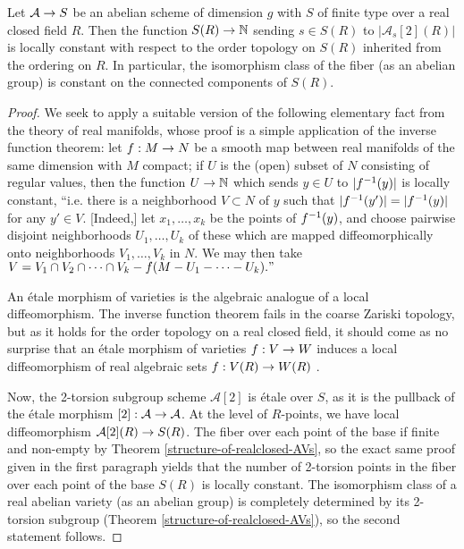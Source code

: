 \begin{proposition}
\label{deformation}
Let $\mathcal{A}\rightarrow S$ be an abelian scheme of dimension $g$ with $S$ of finite type over a real closed field $R$. Then the function $S(R)\rightarrow \mathbb{N}$ sending $s\in S(R)$ to $|\mathcal{A}_s[2](R)|$ is locally constant with respect to the order topology on $S(R)$ inherited from the ordering on $R$. In particular, the isomorphism class of the fiber (as an abelian group) is constant on the connected components of $S(R)$.
\end{proposition}
\begin{proof}
We seek to apply a suitable version of the following elementary fact from the theory of real manifolds, whose proof is a simple application of the inverse function theorem: let $f:M\rightarrow N$ be a smooth map between real manifolds of the same dimension with $M$ compact; if $U$ is the (open) subset of $N$ consisting of regular values, then the function $U\rightarrow \mathbb{N}$ which sends $y\in U$ to $|f^{-1}(y)|$ is locally constant, ``i.e. there is a neighborhood $V\subset N$ of $y$ such that $|f^{-1}(y')|=|f^{-1}(y)|$ for any $y'\in V$. [Indeed,] let $x_1,\dots, x_k$ be the points of $f^{-1}(y)$, and choose pairwise disjoint neighborhoods $U_1,\dots, U_k$ of these which are mapped diffeomorphically onto neighborhoods $V_1,\dots, V_k$ in $N$. We may then take $V=V_1\cap V_2\cap \cdots \cap V_k- f(M- U_1-\cdots- U_k)."$ \cite[pg. 8]{milnor}

An \'etale morphism of varieties is the algebraic analogue of a local diffeomorphism. The inverse function theorem fails in the coarse Zariski topology, but as it holds for the order topology on a real closed field, it should come as no surprise that an \'etale morphism of varieties $f:V\rightarrow W$ induces a local diffeomorphism of real algebraic sets $f:V(R)\rightarrow W(R)$ \cite[Proposition 8.1.2]{real}.

Now, the 2-torsion subgroup scheme $\mathcal{A}[2]$ is \'etale over $S$, as it is the pullback of the \'etale morphism $[2]:\mathcal{A}\rightarrow \mathcal{A}$. At the level of $R$-points, we have local diffeomorphism $\mathcal{A}[2](R)\rightarrow S(R)$. The fiber over each point of the base if finite and non-empty by Theorem \ref{structure-of-realclosed-AVs}, so the exact same proof given in the first paragraph yields that the number of 2-torsion points in the fiber over each point of the base $S(R)$ is locally constant. The isomorphism class of a real abelian variety (as an abelian group) is completely determined by its 2-torsion subgroup (Theorem \ref{structure-of-realclosed-AVs}), so the second statement follows.
\end{proof}